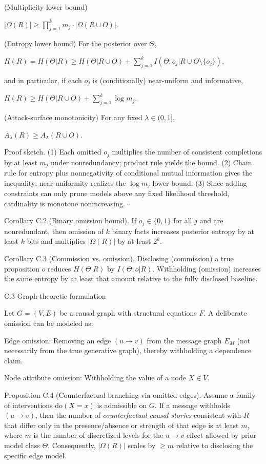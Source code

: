 \documentclass[11pt,a4paper]{article}
\begin{document}
(Multiplicity lower bound)

$|\Omega(R)| \geq \prod_{j=1}^k m_j \cdot |\Omega(R \cup O)|$.

(Entropy lower bound) For the posterior over $\Theta$,

$H(R) = H(\Theta | R) \geq H(\Theta | R \cup O) + \sum_{j=1}^k I(\Theta ; o_j | R \cup O \setminus \{o_j\})$,

and in particular, if each $o_j$ is (conditionally) near-uniform and informative,

$H(R) \geq H(\Theta | R \cup O) + \sum_{j=1}^k \log m_j$.

(Attack-surface monotonicity) For any fixed $\lambda \in (0,1]$,

$A_\lambda(R) \geq A_\lambda(R \cup O)$.

Proof sketch. (1) Each omitted $o_j$ multiplies the number of consistent completions by at least $m_j$ under nonredundancy; product rule yields the bound. (2) Chain rule for entropy plus nonnegativity of conditional mutual information gives the inequality; near-uniformity realizes the $\log m_j$ lower bound. (3) Since adding constraints can only prune models above any fixed likelihood threshold, cardinality is monotone nonincreasing. $\square$

Corollary C.2 (Binary omission bound).
If $o_j \in \{0,1\}$ for all $j$ and are nonredundant, then omission of $k$ binary facts increases posterior entropy by at least $k$ bits and multiplies $|\Omega(R)|$ by at least $2^k$.

Corollary C.3 (Commission vs. omission).
Disclosing (commission) a true proposition $o$ reduces $H(\Theta | R)$ by $I(\Theta ; o | R)$. Withholding (omission) increases the same entropy by at least that amount relative to the fully disclosed baseline.

C.3 Graph-theoretic formulation

Let $G = (V,E)$ be a causal graph with structural equations $F$. A deliberate omission can be modeled as:

Edge omission: Removing an edge $(u \to v)$ from the message graph $E_M$ (not necessarily from the true generative graph), thereby withholding a dependence claim.

Node attribute omission: Withholding the value of a node $X \in V$.

Proposition C.4 (Counterfactual branching via omitted edges).
Assume a family of interventions $\mathrm{do}(X=x)$ is admissible on $G$. If a message withholds $(u \to v)$, then the number of \emph{counterfactual causal stories} consistent with $R$ that differ only in the presence/absence or strength of that edge is at least $m$, where $m$ is the number of discretized levels for the $u \to v$ effect allowed by prior model class $\Theta$. Consequently, $|\Omega(R)|$ scales by $\geq m$ relative to disclosing the specific edge model.
\end{document}
